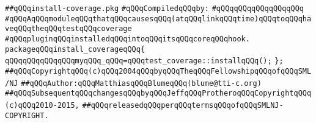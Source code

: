 \label{src/app/debug/install-coverage.pkg}
\verb|##qQQqinstall-coverage.pkg|\newline
\newline
\verb|#qQQqCompiledqQQqby:|\newline
\verb|#qQQqqQQqqQQqqQQqqQQq|\newline
\newline
\verb|#qQQqAqQQqmoduleqQQqthatqQQqcausesqQQq(atqQQqlinkqQQqtime)qQQqtoqQQqhaveqQQqtheqQQqtestqQQqcoverage|\newline
\verb|#qQQqpluginqQQqinstalledqQQqintoqQQqitsqQQqcoreqQQqhook.|\newline
\newline
\verb|packageqQQqinstall_coverageqQQq{|\newline
\verb|qQQqqQQqqQQqqQQqmyqQQq_qQQq=qQQqtest_coverage::installqQQq();|\newline
\verb|};|\newline
\newline
\newline
\verb|##qQQqCopyrightqQQq(c)qQQq2004qQQqbyqQQqTheqQQqFellowshipqQQqofqQQqSML/NJ|\newline
\verb|##qQQqAuthor:qQQqMatthiasqQQqBlumeqQQq(blume@tti-c.org)|\newline
\verb|##qQQqSubsequentqQQqchangesqQQqbyqQQqJeffqQQqProtheroqQQqCopyrightqQQq(c)qQQq2010-2015,|\newline
\verb|##qQQqreleasedqQQqperqQQqtermsqQQqofqQQqSMLNJ-COPYRIGHT.|\newline

